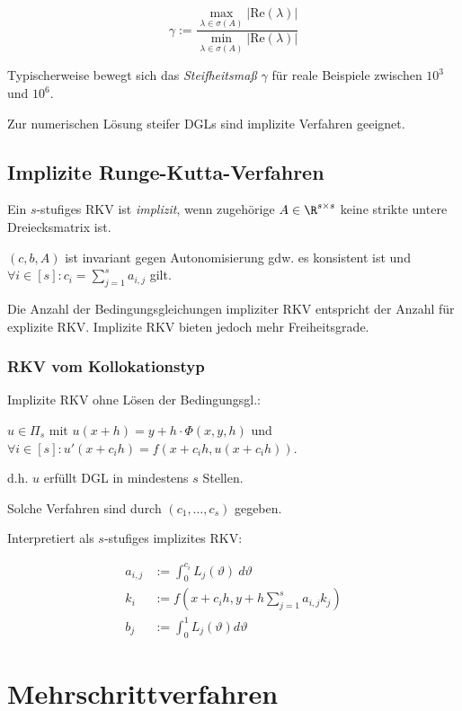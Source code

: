 $$\gamma := \frac{\max_{\lambda \in \sigma(A)}{|\text{Re}(\lambda)|}}{\min_{\lambda \in \sigma(A)}{|\text{Re}(\lambda)|}}$$

Typischerweise bewegt sich das \emph{Steifheitsmaß} $\gamma$ für reale Beispiele zwischen ${10}^3$ und ${10}^6$.

\spacing

Zur numerischen Lösung steifer DGLs sind implizite Verfahren geeignet.

\subsection*{Implizite Runge-Kutta-Verfahren}

Ein $s$-stufiges RKV ist \emph{implizit}, wenn zugehörige $A \in \R^{s \times s}$ keine strikte untere Dreiecksmatrix ist.

\spacing

$(c,b,A)$ ist invariant gegen Autonomisierung gdw. es konsistent ist und $\forall i \in [s] : c_i = \sum_{j=1}^s a_{i,j}$ gilt.

\spacing

Die Anzahl der Bedingungsgleichungen impliziter RKV entspricht der Anzahl für explizite RKV. Implizite RKV bieten jedoch mehr Freiheitsgrade.

\subsubsection*{RKV vom Kollokationstyp}

Implizite RKV ohne Lösen der Bedingungsgl.:

$u \in \Pi_s$ mit $u(x+h) = y+h\cdot\Phi(x,y,h)$ und $\forall i \in [s] : u'(x+c_i h) = f(x+c_i h,u(x+c_i h))$.

d.h. $u$ erfüllt DGL in mindestens $s$ Stellen.

Solche Verfahren sind durch $(c_1,\dots,c_s)$ gegeben.

Interpretiert als $s$-stufiges implizites RKV:

\vspace*{-4mm}
\begin{align*}
a_{i,j} &:= \int_0^{c_i} L_j(\vartheta) \ d\vartheta \\
k_i &:= f(x+c_ih,y+h\sum_{j=1}^s a_{i,j} k_j) \\
b_j &:= \int_0^1 L_j(\vartheta) d\vartheta
\end{align*}

\section*{Mehrschrittverfahren}

